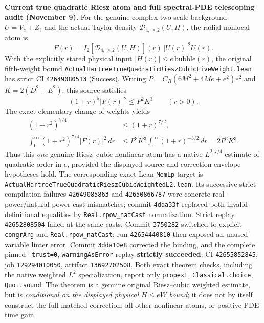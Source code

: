 \documentclass[11pt]{amsart}
\begin{document}
\medskip
\noindent\textbf{Current true quadratic Riesz atom and full spectral-PDE telescoping audit (November 9).}
For the genuine complex two-scale background
\(U=V_c+Z_\ell\) and the actual Taylor density
\(\mathcal D_{4,\ge2}(U,H)\), the radial nonlocal atom is
\[
  F(r)=I_2[\mathcal D_{4,\ge2}(U,H)](r)\,|U(r)|^2U(r).
\]
With the explicitly stated physical input
\(\lvert H(r)\rvert\le e\,\mathrm{bubble}(r)\), the original
fifth-weight bound \texttt{ActualHartreeTrueQuadraticRieszCubicFiveWeight.lean}
has strict CI \texttt{42649080513} (Success).
Writing \(P=C_R(6M^2+4Me+e^2)e^2\) and
\(K=2(D^2+E^2)\), this source satisfies
\[
 (1+r)^5 |F(r)|^2\le P^2K^3\qquad(r>0).
\]
The exact elementary change of weights yields
\begin{align*}
 (1+r^2)^{7/4}&\le(1+r)^{7/2},\\
 \int_0^\infty(1+r^2)^{7/4}|F(r)|^2\,dr
 &\le P^2K^3\int_0^\infty(1+r)^{-3/2}\,dr
   =2P^2K^3.
\end{align*}
Thus this \emph{one} genuine Riesz--cubic nonlinear atom has a
native \(L^{2,7/4}\) estimate of quadratic order in \(e\), provided
the displayed source and correction-envelope hypotheses hold.
The corresponding exact Lean \texttt{MemLp} target is
\texttt{ActualHartreeTrueQuadraticRieszCubicWeightedL2.lean}.
Its successive strict compilation failures \texttt{42649085863}
and \texttt{42650866787} were concrete real-power/natural-power
cast mismatches; commit \texttt{4dda33f} replaced both invalid
definitional equalities by \texttt{Real.rpow\_natCast} normalization.
Strict replay \texttt{42652808504} failed at the same casts.
Commit \texttt{3750282} switched to explicit \texttt{congrArg}
and \texttt{Real.rpow\_natCast}; run \texttt{42654440810}
then exposed an unused-variable linter error. Commit \texttt{3dda10e8}
corrected the binding, and the complete pinned
\texttt{--trust=0}, \texttt{warningAsError} replay
\textbf{strictly succeeded}: CI \texttt{42655852845},
job \texttt{129294010050}, artifact \texttt{13692702508}.
Both exact theorem checks, including the native weighted \(L^2\)
specialization, report only \texttt{propext},
\texttt{Classical.choice}, \texttt{Quot.sound}. The theorem
is a genuine original Riesz--cubic weighted estimate, but is
\emph{conditional on the displayed physical }\(H\le eW\)
\emph{ bound}; it does not by itself construct the full matched
correction, all other nonlinear atoms, or positive PDE time gain.
\end{document}
